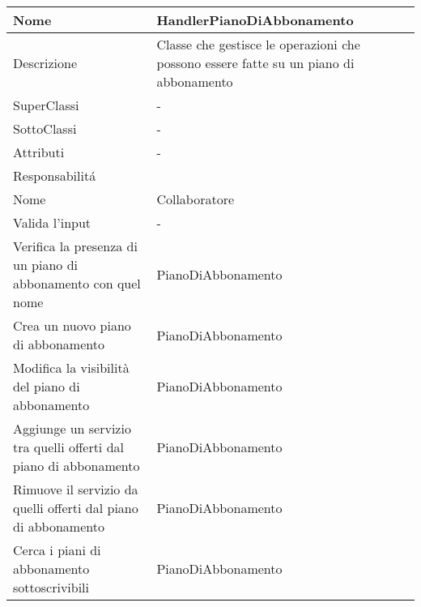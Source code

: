 \begin{center}
    \begin{longtable}{ |p{3cm}|p{3cm}|p{3cm}|p{3cm}| }
        \hline
        Nome & \multicolumn{3}{|p{9cm}|}{HandlerPianoDiAbbonamento} \\\hline
        Descrizione & \multicolumn{3}{|p{9cm}|}{Classe che gestisce le operazioni che possono essere fatte su un piano di abbonamento} \\\hline
        SuperClassi & \multicolumn{3}{|p{9cm}|}{-} \\\hline
        SottoClassi & \multicolumn{3}{|p{9cm}|}{-} \\\hline
        Attributi & \multicolumn{3}{|p{9cm}|}{-} \\\hline
        \multicolumn{4}{|p{12cm}|}{Responsabilit\'a} \\\hline
        \multicolumn{2}{|p{6cm}|}{Nome} & \multicolumn{2}{|p{6cm}|}{Collaboratore} \\\hline
        \multicolumn{2}{|p{6cm}|}{Valida l'input} & \multicolumn{2}{|p{6cm}|}{-} \\\hline
        \multicolumn{2}{|p{6cm}|}{Verifica la presenza di un piano di abbonamento con quel nome} & \multicolumn{2}{|p{6cm}|}{PianoDiAbbonamento} \\\hline
        \multicolumn{2}{|p{6cm}|}{Crea un nuovo piano di abbonamento} & \multicolumn{2}{|p{6cm}|}{PianoDiAbbonamento} \\\hline
        \multicolumn{2}{|p{6cm}|}{Modifica la visibilità del piano di abbonamento} & \multicolumn{2}{|p{6cm}|}{PianoDiAbbonamento} \\\hline
        \multicolumn{2}{|p{6cm}|}{Aggiunge un servizio tra quelli offerti dal piano di abbonamento} & \multicolumn{2}{|p{6cm}|}{PianoDiAbbonamento} \\\hline
        \multicolumn{2}{|p{6cm}|}{Rimuove il servizio da quelli offerti dal piano di abbonamento} & \multicolumn{2}{|p{6cm}|}{PianoDiAbbonamento} \\\hline
        \multicolumn{2}{|p{6cm}|}{Cerca i piani di abbonamento sottoscrivibili} & \multicolumn{2}{|p{6cm}|}{PianoDiAbbonamento} \\\hline
    \end{longtable}
\end{center}

